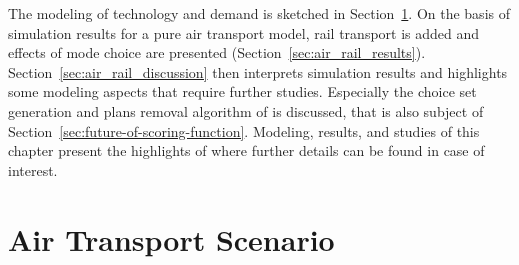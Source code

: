 The modeling of technology and demand is sketched in Section~\ref{sec:air_rail_scenario}. 
On the basis of simulation results for a pure air transport model, rail transport is added and effects of mode choice are presented (Section~\ref{sec:air_rail_results}). 
Section~\ref{sec:air_rail_discussion} then interprets simulation results and highlights some modeling aspects that require further studies. 
Especially the choice set generation and plans removal algorithm of  is discussed, that is also subject of Section~\ref{sec:future-of-scoring-function}. 
Modeling, results, and studies of this chapter present the highlights of \citet[][Chapter~6, pp.~119]{Grether2014PhD} where further details can be found in case of interest.   

\section{Air Transport Scenario}
\label{sec:air_rail_scenario}
